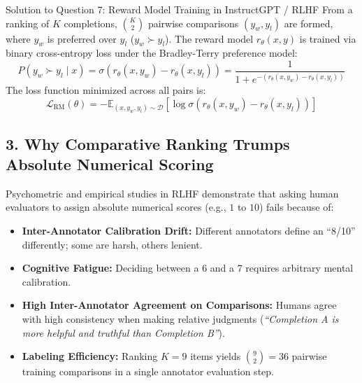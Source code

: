 \documentclass[11pt,a4paper]{article}
\begin{document}
\begin{solutionbox}{Solution to Question 7: Reward Model Training in InstructGPT / RLHF}
From a ranking of $K$ completions, $\binom{K}{2}$ pairwise comparisons $(y_w, y_l)$ are formed, where $y_w$ is preferred over $y_l$ ($y_w \succ y_l$). The reward model $r_\theta(x, y)$ is trained via binary cross-entropy loss under the Bradley-Terry preference model:
\begin{equation}
    P(y_w \succ y_l \mid x) = \sigma\left(r_\theta(x, y_w) - r_\theta(x, y_l)\right) = \frac{1}{1 + e^{-(r_\theta(x, y_w) - r_\theta(x, y_l))}}
\end{equation}
The loss function minimized across all pairs is:
\begin{equation}
    \mathcal{L}_{\text{RM}}(\theta) = -\mathbb{E}_{(x, y_w, y_l) \sim \mathcal{D}}\left[ \log \sigma\left( r_\theta(x, y_w) - r_\theta(x, y_l) \right) \right]
\end{equation}

\subsection*{3. Why Comparative Ranking Trumps Absolute Numerical Scoring}
Psychometric and empirical studies in RLHF demonstrate that asking human evaluators to assign absolute numerical scores (e.g., $1$ to $10$) fails because of:
\begin{itemize}[leftmargin=1.5em,itemsep=1pt]
    \item \textbf{Inter-Annotator Calibration Drift:} Different annotators define an ``8/10'' differently; some are harsh, others lenient.
    \item \textbf{Cognitive Fatigue:} Deciding between a 6 and a 7 requires arbitrary mental calibration.
    \item \textbf{High Inter-Annotator Agreement on Comparisons:} Humans agree with high consistency when making relative judgments (\textit{``Completion A is more helpful and truthful than Completion B''}).
    \item \textbf{Labeling Efficiency:} Ranking $K = 9$ items yields $\binom{9}{2} = 36$ pairwise training comparisons in a single annotator evaluation step.
\end{itemize}


\end{solutionbox}
\end{document}
